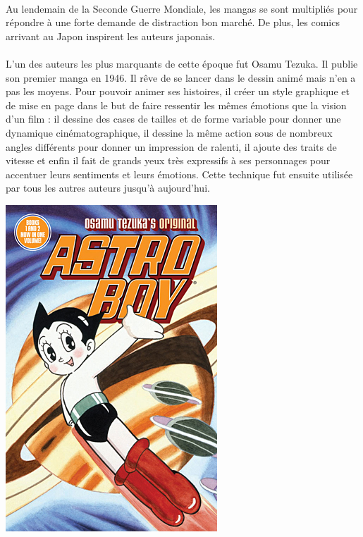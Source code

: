 \paragraph{} Au lendemain de la Seconde Guerre Mondiale, les mangas se sont
multipliés pour répondre à une forte demande de distraction bon marché. De
plus, les comics arrivant au Japon inspirent les auteurs japonais. 

\paragraph{} L’un des auteurs les plus marquants de cette époque fut Osamu
Tezuka. Il publie son premier manga en 1946. Il rêve de se lancer dans le
dessin animé mais n’en a pas les moyens. Pour pouvoir animer ses histoires, il
créer un style graphique et de mise en page dans le but de faire ressentir les
mêmes émotions que la vision d’un film : il dessine des cases de tailles et de
forme variable pour donner une dynamique cinématographique, il dessine la même
action sous de nombreux angles différents pour donner un impression de ralenti,
il ajoute des traits de vitesse et enfin il fait de grands yeux très expressifs
à ses personnages pour accentuer leurs sentiments et leurs émotions. Cette
technique fut ensuite utilisée par tous les autres auteurs jusqu’à aujourd’hui. 

\begin{center}
	\includegraphics[scale=0.4]{astroboy.jpg}
\end{center}

